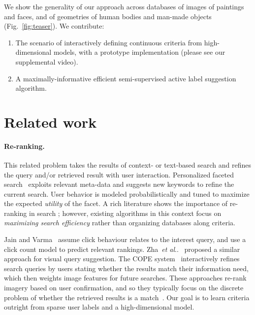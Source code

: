 \documentclass{article}
\makeatletter
\DeclareRobustCommand\onedot{\futurelet\@let@token\@onedot}
\def\@onedot{\ifx\@let@token.\else.\null\fi\xspace}
\def\etal{\emph{et al}\onedot}
\makeatother
\begin{document}
We show the generality of our approach across databases of images of paintings and faces, and of geometries of human bodies and man-made objects (Fig.~\ref{fig:teaser}). We contribute:
\begin{enumerate} \itemsep0pt
\item The scenario of interactively defining continuous criteria from high-dimensional models, with a prototype implementation (please see our supplemental video).
\item A maximally-informative efficient semi-supervised active label suggestion algorithm.
\end{enumerate}

\section{Related work}
\paragraph{Re-ranking.}
This related problem takes the results of context- or text-based search and refines the query and/or retrieved result with user interaction. Personalized faceted search~\cite{KorZhaLiu08} exploits relevant meta-data and suggests new keywords to refine the current search. User behavior is modeled probabilistically and tuned to maximize the expected \emph{utility} of the facet. A rich literature shows the importance of re-ranking in search \cite{KorZhaLiu08}; however, existing algorithms in this context focus on \emph{maximizing search efficiency} rather than organizing databases along criteria.

Jain and Varma~\cite{JaiVar11} assume click behaviour relates to the interest query, and use a click count model to predict relevant rankings. Zha~\etal~\cite{ZhaYanMei10} proposed a similar approach for visual query suggestion. The COPE system~\cite{BalHalJos12} interactively refines search queries by users stating whether the results match their information need, which then weights image features for future searches. These approaches re-rank imagery based on user confirmation, and so they typically focus on the discrete problem of whether the retrieved results is a match~\cite{KorZhaLiu08}. Our goal is to learn criteria outright from sparse user labels and a high-dimensional model.
\end{document}
